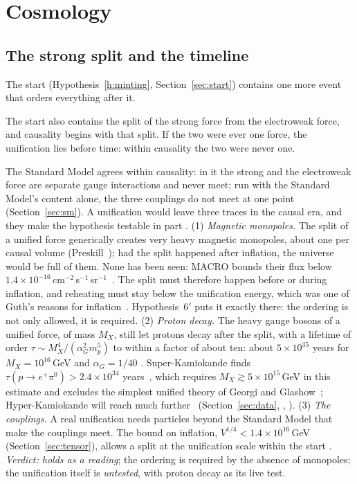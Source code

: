 \section{Cosmology}\label{sec:cosmo}


\subsection{The strong split and the timeline}\label{sec:split}

The start (Hypothesis~\ref{h:minting}, Section~\ref{sec:start}) contains one more event that orders everything after it.

\begin{hypothesisprime6}
The start also contains the split of the strong force from the electroweak force, and causality begins with that split. If the two
were ever one force, the unification lies before time: within causality the two were never one. \tagH
\end{hypothesisprime6}

\noindent The Standard Model agrees within causality: in it the strong and the electroweak force are separate gauge interactions
and never meet; run with the Standard Model's content alone, the three couplings do not meet at one point~\cite{amaldi}
(Section~\ref{sec:sm}). A unification
would leave three traces in the causal era, and they make the hypothesis testable in part \tagP. (1) \emph{Magnetic monopoles.} The split of
a unified force generically creates very heavy magnetic monopoles, about one per causal volume (Preskill~\cite{preskill}); had the split
happened after inflation, the universe would be full of them. None has been seen: MACRO bounds their flux below
$1.4\times10^{-16}$\,cm$^{-2}$\,s$^{-1}$\,sr$^{-1}$~\cite{macro}. The split must therefore happen before or during inflation, and reheating
must stay below the unification energy, which was one of Guth's reasons for inflation~\cite{guth}. Hypothesis~6$'$ puts it exactly there:
the ordering is not only allowed, it is required. (2) \emph{Proton decay.} The heavy gauge bosons of a unified force, of mass $M_X$, still
let protons decay after the split, with a lifetime of order $\tau\sim M_X^4/(\alpha_G^2m_p^5)$ to within a factor of about ten: about
$5\times10^{35}$ years for $M_X=10^{16}$\,GeV and $\alpha_G=1/40$ . Super-Kamiokande finds $\tau(p\to e^+\pi^0)>2.4\times10^{34}$
years~\cite{superk}, which requires $M_X\gtrsim5\times10^{15}$\,GeV in this estimate and excludes the simplest unified theory of Georgi and
Glashow~\cite{georgiglashow}; Hyper-Kamiokande will reach much further~\cite{hyperk} (Section~\ref{sec:data}, ,
). (3) \emph{The couplings.} A real unification needs
particles beyond the Standard Model that make the couplings meet. The bound on inflation, $V^{1/4}<1.4\times10^{16}$\,GeV
(Section~\ref{sec:tensor}), allows a split at the unification scale within the start . \emph{Verdict: holds as a reading}; the
ordering is required by the absence of monopoles; the unification itself is \emph{untested}, with proton decay as its live test.

